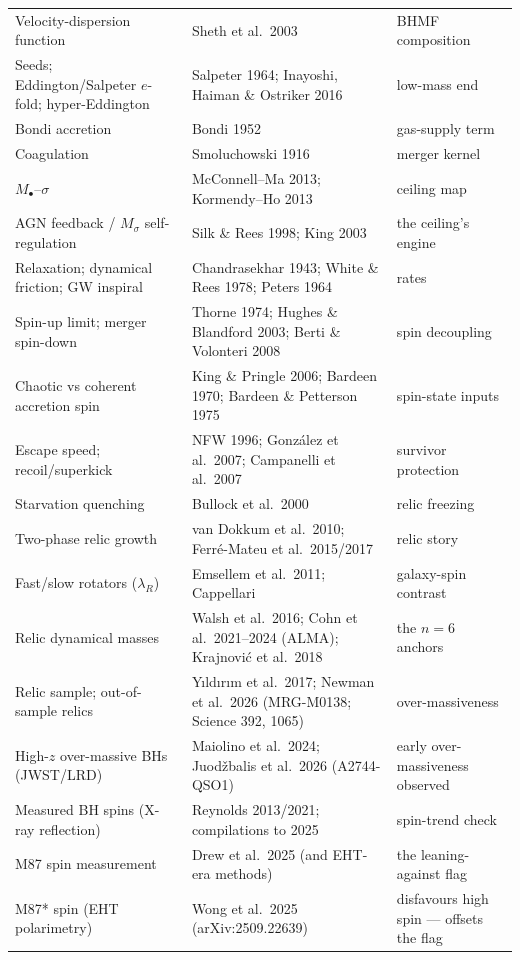 \documentclass[11pt]{article}
\begin{document}
\begin{small}
\begin{longtable}{p{}p{}p{}}
Velocity-dispersion function & Sheth et al.\ 2003 & BHMF composition\\
Seeds; Eddington/Salpeter $e$-fold; hyper-Eddington & Salpeter 1964; Inayoshi, Haiman \& Ostriker 2016 & low-mass end\\
Bondi accretion & Bondi 1952 & gas-supply term\\
Coagulation & Smoluchowski 1916 & merger kernel\\
$M_\bullet$--$\sigma$ & McConnell--Ma 2013; Kormendy--Ho 2013 & ceiling map\\
AGN feedback / $M_\sigma$ self-regulation & Silk \& Rees 1998; King 2003 & the ceiling's engine\\
Relaxation; dynamical friction; GW inspiral & Chandrasekhar 1943; White \& Rees 1978; Peters 1964 & rates\\
Spin-up limit; merger spin-down & Thorne 1974; Hughes \& Blandford 2003; Berti \& Volonteri 2008 & spin decoupling\\
Chaotic vs coherent accretion spin & King \& Pringle 2006; Bardeen 1970; Bardeen \& Petterson 1975 & spin-state inputs\\
Escape speed; recoil/superkick & NFW 1996; Gonz\'alez et al.\ 2007; Campanelli et al.\ 2007 & survivor protection\\
Starvation quenching & Bullock et al.\ 2000 & relic freezing\\
Two-phase relic growth & van Dokkum et al.\ 2010; Ferr\'e-Mateu et al.\ 2015/2017 & relic story\\
Fast/slow rotators ($\lambda_R$) & Emsellem et al.\ 2011; Cappellari & galaxy-spin contrast\\
Relic dynamical masses & Walsh et al.\ 2016; Cohn et al.\ 2021--2024 (ALMA); Krajnovi\'c et al.\ 2018 & the $n=6$ anchors\\
Relic sample; out-of-sample relics & Y{\i}ld{\i}r{\i}m et al.\ 2017; Newman et al.\ 2026 (MRG-M0138; Science 392, 1065) & over-massiveness\\
High-$z$ over-massive BHs (JWST/LRD) & Maiolino et al.\ 2024; Juod\v{z}balis et al.\ 2026 (A2744-QSO1) & early over-massiveness observed\\
Measured BH spins (X-ray reflection) & Reynolds 2013/2021; compilations to 2025 & spin-trend check\\
M87 spin measurement & Drew et al.\ 2025 (and EHT-era methods) & the leaning-against flag\\
M87* spin (EHT polarimetry) & Wong et al.\ 2025 (arXiv:2509.22639) & disfavours high spin --- offsets the flag\\

\end{longtable}
\end{small}
\end{document}
